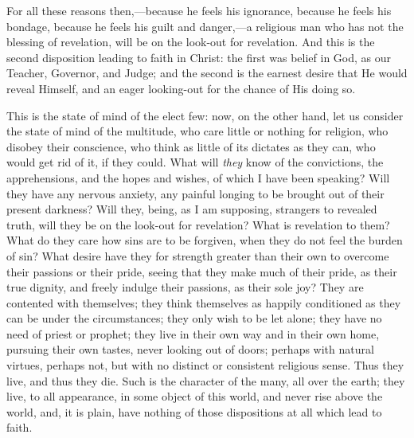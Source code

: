 For all these reasons then,—because he feels his
ignorance, because he feels his bondage, because he feels
his guilt and danger,—a religious man who has not
the blessing of revelation, will be on the look-out for
revelation. And this is the second disposition leading to
faith in Christ: the first was belief in God, as our
Teacher, Governor, and Judge; and the second is the
earnest desire that He would reveal Himself, and an eager
looking-out for the chance of His doing so.

This is the state of mind of the elect few: now, on
the other hand, let us consider the state of mind of the
multitude, who care little or nothing for religion, who
disobey their conscience, who think as little of its
dictates as they can, who would get rid of it, if they
could. What will \emph{they} know of the convictions, the
apprehensions, and the hopes and wishes, of which I have
been speaking? Will they have any nervous anxiety, any
painful longing to be brought out of their present
darkness? Will they, being, as I am supposing, strangers
to revealed truth, will they be on the look-out for
revelation? What is revelation to them? What do they care
how sins are to be forgiven, when they do not feel the
burden of sin? What desire have they for strength greater
than their own to overcome their passions or their pride,
seeing that they make much of their pride, as their true
dignity, and freely indulge their passions, as their sole
joy? They are contented with themselves; they think
themselves as happily conditioned as they can be under
the circumstances; they only wish to be let alone; they
have no need of priest or prophet; they live in their own
way and in their own home, pursuing their own tastes,
never looking out of doors; perhaps with natural virtues,
perhaps not, but with no distinct or consistent religious
sense. Thus they live, and thus they die. Such is the
character of the many, all over the earth; they live, to
all appearance, in some object of this world, and never
rise above the world, and, it is plain, have nothing of
those dispositions at all which lead to faith.

